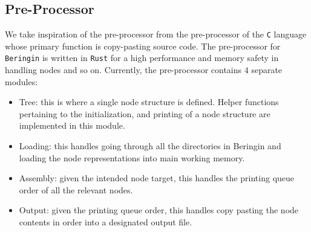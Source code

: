\documentclass[a4paper, 12pt]{report}
\begin{document}
\begin{center}
\section{Pre-Processor}
\begin{comment}
\end{comment}
We take inspiration of the pre-processor from the pre-processor of the \texttt{C} language whose primary function is copy-pasting source code. 
The pre-processor for \texttt{Beringin} is written in \texttt{Rust} for a high performance and memory safety in handling nodes and so on.
Currently, the pre-processor contains $4$ separate modules:
\begin{itemize}
\item Tree: this is where a single node structure is defined. Helper functions pertaining to the initialization, and printing of a node structure are implemented in this module.
\item Loading: this handles going through all the directories in Beringin and loading the node representations into main working memory.
\item Assembly: given the intended node target, this handles the printing queue order of all the relevant nodes.
\item Output: given the printing queue order, this handles copy pasting the node contents in order into a designated output file.
\end{itemize}


\end{center}
\end{document}
